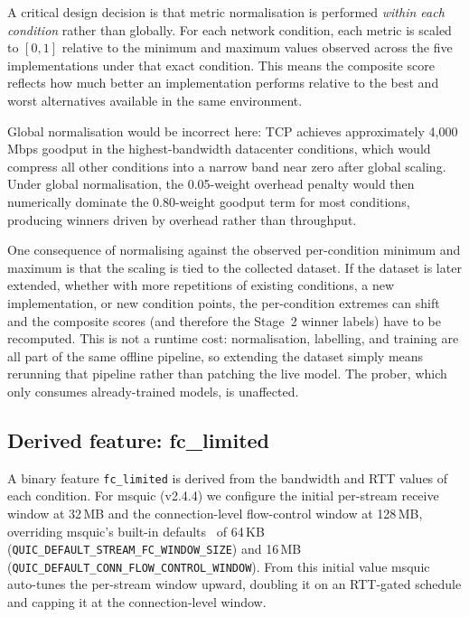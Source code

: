 A critical design decision is that metric normalisation is performed
\textit{within each condition} rather than globally. For each network
condition, each metric is scaled to $[0, 1]$ relative to the minimum and
maximum values observed across the five implementations under that exact
condition. This means the composite score reflects how much better an
implementation performs relative to the best and worst alternatives available
in the same environment.

Global normalisation would be incorrect here: TCP achieves approximately
4,000\,Mbps goodput in the highest-bandwidth datacenter conditions, which would
compress all other conditions into a narrow band near zero after global scaling.
Under global normalisation, the 0.05-weight overhead penalty would then
numerically dominate the 0.80-weight goodput term for most conditions, producing
winners driven by overhead rather than throughput.

One consequence of normalising against the observed per-condition minimum and
maximum is that the scaling is tied to the collected dataset. If the dataset is
later extended, whether with more repetitions of existing conditions, a new
implementation, or new condition points, the per-condition extremes can shift
and the composite scores (and therefore the Stage~2 winner labels) have to be
recomputed. This is not a runtime cost: normalisation, labelling, and training
are all part of the same offline pipeline, so extending the dataset simply means
rerunning that pipeline rather than patching the live model. The prober, which
only consumes already-trained models, is unaffected.

\subsection{Derived feature: fc\_limited}
\label{subsec:fc-limited}

A binary feature \texttt{fc\_limited} is derived from the bandwidth and RTT
values of each condition. For msquic (v2.4.4) we configure the initial
per-stream receive window at 32\,MB and the connection-level flow-control
window at 128\,MB, overriding msquic's built-in defaults~\cite{microsoft-msquic}
of 64\,KB (\texttt{QUIC\_DEFAULT\_STREAM\_FC\_WINDOW\_SIZE}) and 16\,MB
(\texttt{QUIC\_DEFAULT\_CONN\_FLOW\_CONTROL\_WINDOW}). From this initial value
msquic auto-tunes the per-stream window upward, doubling it on an RTT-gated
schedule and capping it at the connection-level window.

